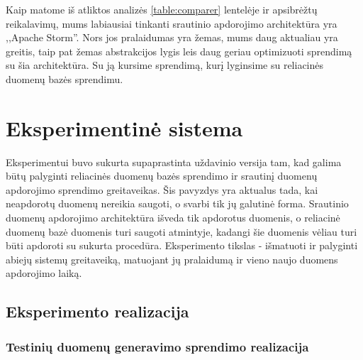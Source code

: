 \documentclass{VUMIFPSkursinis}
\begin{document}
Kaip matome iš atliktos analizės \ref{table:comparer} lentelėje ir apsibrėžtų reikalavimų, mums labiausiai tinkanti srautinio apdorojimo architektūra yra ,,Apache Storm''. 
Nors jos pralaidumas yra žemas, mums daug aktualiau yra greitis, taip pat žemas abstrakcijos lygis leis daug geriau optimizuoti sprendimą su šia architektūra. Su ją kursime
sprendimą, kurį lyginsime su reliacinės duomenų bazės sprendimu.

\section{Eksperimentinė sistema}
Eksperimentui buvo sukurta supaprastinta uždavinio versija tam, kad galima būtų palyginti reliacinės duomenų bazės sprendimo ir srautinį duomenų apdorojimo sprendimo greitaveikas.
Šis pavyzdys yra aktualus tada, kai neapdorotų duomenų nereikia saugoti, o svarbi tik jų galutinė forma. Srautinio duomenų apdorojimo architektūra
išveda tik apdorotus duomenis, o reliacinė duomenų bazė duomenis turi saugoti atmintyje, kadangi šie duomenis vėliau turi būti apdoroti su sukurta 
procedūra. Eksperimento tikslas - išmatuoti ir palyginti abiejų sistemų greitaveiką, matuojant jų pralaidumą ir vieno naujo duomens apdorojimo laiką.
\subsection{Eksperimento realizacija}

\subsubsection{Testinių duomenų generavimo sprendimo realizacija}
\end{document}
